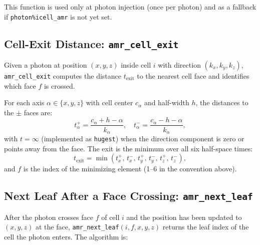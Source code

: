 \documentclass[english,a4paper]{my_memo}
\begin{document}
This function is used only at photon injection (once per photon) and as a
fallback if \texttt{photon\%icell\_amr} is not yet set.

\subsection{Cell-Exit Distance: \texttt{amr\_cell\_exit}}

Given a photon at position $(x, y, z)$ inside cell $i$ with direction
$(k_x, k_y, k_z)$, \texttt{amr\_cell\_exit} computes the distance $t_\mathrm{exit}$
to the nearest cell face and identifies which face $f$ is crossed.

For each axis $\alpha \in \{x, y, z\}$ with cell center $c_\alpha$ and
half-width $h$, the distances to the $\pm$ faces are:
\begin{equation}
  t_\alpha^+ = \frac{c_\alpha + h - \alpha}{k_\alpha}, \quad
  t_\alpha^- = \frac{c_\alpha - h - \alpha}{k_\alpha},
\end{equation}
with $t = \infty$ (implemented as \texttt{hugest}) when the direction component
is zero or points away from the face.  The exit is the minimum over all six
half-space times:
\begin{equation}
  t_\mathrm{exit} = \min(t_x^+,\, t_x^-,\, t_y^+,\, t_y^-,\, t_z^+,\, t_z^-),
\end{equation}
and $f$ is the index of the minimizing element (1–6 in the convention above).

\subsection{Next Leaf After a Face Crossing: \texttt{amr\_next\_leaf}}
\label{sec:next_leaf}

\begin{sloppypar}
After the photon crosses face $f$ of cell $i$ and the position has been updated
to $(x, y, z)$ at the face, \texttt{amr\_next\_leaf}$(i, f, x, y, z)$ returns
the leaf index of the cell the photon enters.  The algorithm is:
\end{sloppypar}
\end{document}
